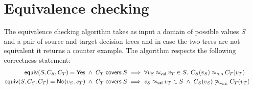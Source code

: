 \documentclass[12pt]{article}
\begin{document}
\section{Equivalence checking}
The equivalence checking algorithm takes as input a domain of
possible values \emph{S} and a pair of source and target decision trees and
in case the two trees are not equivalent it returns a counter example.
The algorithm respects the following correctness statement:
\begin{align*}
 \SimpleEquiv S {C_S} {C_T} = \Yes \;\land\; \covers {C_T} S
 & \implies
 \forall {\vrel {v_S} {v_T}} \in S,\; \runrel {C_S(v_S)} {C_T(v_T)}
\\
 \SimpleEquiv S {C_S} {C_T} = \No {v_S} {v_T} \;\land\; \covers {C_T} S
 & \implies
 \vrel {v_S} {v_T} \in S \;\land\; {\nparamrel{run} {C_S(v_S)} {C_T(v_T)}}
\end{align*}
\end{document}
